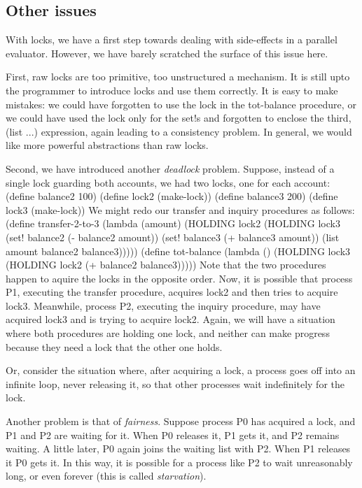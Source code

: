 \subsection{Other issues}

With locks, we have a first step towards dealing with side-effects in a
parallel evaluator.  However, we have barely scratched the surface of this
issue here.

First, raw locks are too primitive, too unstructured a mechanism.  It is
still upto the programmer to introduce locks and use them correctly.  It is
easy to make mistakes: we could have forgotten to use the lock in the {\cf
tot-balance} procedure, or we could have used the lock only for the {\cf
set!}s and forgotten to enclose the third, {\cf (list ...)} expression,
again leading to a consistency problem.  In general, we would like more
powerful abstractions than raw locks.

Second, we have introduced another {\em deadlock\/} problem.  Suppose, instead
of a single lock guarding both accounts, we had two locks, one for each
account:
\beginlisp
(define balance2 100)
(define lock2 (make-lock))
(define balance3 200)
(define lock3 (make-lock))
\endlisp
We might redo our transfer and inquiry procedures as follows:
\beginlisp
(define transfer-2-to-3 (lambda (amount)
  (HOLDING lock2
    (HOLDING lock3
      (set! balance2 (- balance2 amount))
      (set! balance3 (+ balance3 amount))
      (list amount balance2 balance3)))))
\null
(define tot-balance (lambda ()
  (HOLDING lock3
    (HOLDING lock2
      (+ balance2 balance3)))))
\endlisp
 Note that the two procedures happen to aquire the locks in the opposite
order.  Now, it is possible that process P1, executing the transfer
procedure, acquires {\cf lock2} and then tries to acquire {\cf lock3}.
Meanwhile, process P2, executing the inquiry procedure, may have acquired
{\cf lock3} and is trying to acquire {\cf lock2}.  Again, we will have a
situation where both procedures are holding one lock, and neither can make
progress because they need a lock that the other one holds.

Or, consider the situation where, after acquiring a lock, a process goes
off into an infinite loop, never releasing it, so that other processes wait
indefinitely for the lock.

Another problem is that of {\em fairness\/}.  Suppose process P0 has
acquired a lock, and P1 and P2 are waiting for it.  When P0 releases it, P1
gets it, and P2 remains waiting.  A little later, P0 again joins the waiting
list with P2.  When P1 releases it P0 gets it.  In this way, it is possible
for a process like P2 to wait unreasonably long, or even forever (this is
called {\em starvation\/}).

